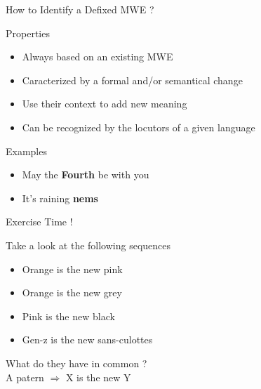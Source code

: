 \documentclass[serif, aspectratio=169]{beamer}
\begin{document}
\begin{frame}{How to Identify a Defixed MWE ?}
    \begin{block}{Properties}
        \begin{itemize}
            \item Always based on an existing MWE
            \item Caracterized by a formal and/or semantical change
            \item Use their context to add new meaning
            \item Can be recognized by the locutors of a given language 
        \end{itemize}
    \end{block}
    \vfill
    \begin{block}{Examples}
        \begin{itemize}
            \item May the \textbf{Fourth} be with you
            \item It's raining \textbf{nems}
        \end{itemize}
    \end{block}
\end{frame}

\begin{exoframe}{Exercise Time !}
    \begin{block}{Take a look at the following sequences}
        \begin{itemize} \color{white}
            \item Orange is the new pink
            \item Orange is the new grey
            \item Pink is the new black
            \item Gen-z is the new sans-culottes
        \end{itemize}
    \end{block}
    \vfill
    \begin{center}
        \Large
        What do they have in common ? \\
        \pause
        A patern $\Rightarrow$ X is the new Y
    \end{center}
\end{exoframe}
\end{document}
